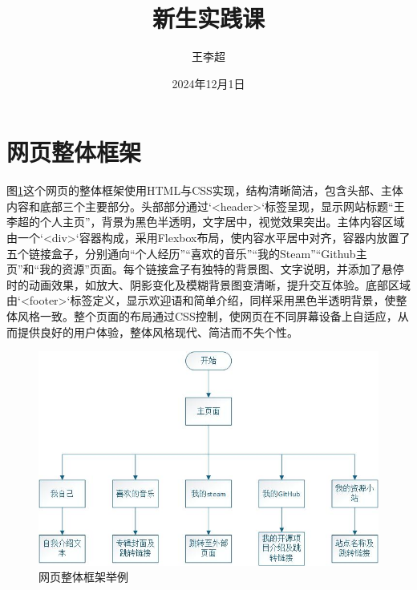 \documentclass[supercite]{Experimental_Report}
\title{~~~~~~新生实践课~~~~~~}
\author{王李超}
\date{2024年12月1日}
\theoremstyle{definition}
\begin{document}
\maketitle

\clearpage


\tableofcontents[level=2]
\clearpage


\section{网页整体框架}

图\ref{fig1-1}这个网页的整体框架使用HTML与CSS实现，结构清晰简洁，包含头部、主体内容和底部三个主要部分。头部部分通过`<header>`标签呈现，显示网站标题“王李超的个人主页”，背景为黑色半透明，文字居中，视觉效果突出。主体内容区域由一个`<div>`容器构成，采用Flexbox布局，使内容水平居中对齐，容器内放置了五个链接盒子，分别通向“个人经历”“喜欢的音乐”“我的Steam”“Github主页”和“我的资源”页面。每个链接盒子有独特的背景图、文字说明，并添加了悬停时的动画效果，如放大、阴影变化及模糊背景图变清晰，提升交互体验。底部区域由`<footer>`标签定义，显示欢迎语和简单介绍，同样采用黑色半透明背景，使整体风格一致。整个页面的布局通过CSS控制，使网页在不同屏幕设备上自适应，从而提供良好的用户体验，整体风格现代、简洁而不失个性。


\begin{figure}[htb] %
	\begin{center}
		\includegraphics[scale=0.80]{images/1-1.jpg}
		\caption{网页整体框架举例}
		\label{fig1-1}
	\end{center}
\end{figure}
\end{document}
